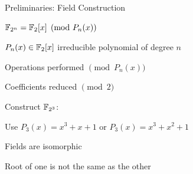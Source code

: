 \begin{frame}{\large Preliminaries: Field Construction}
\bi
	\item ${\mathbb{F}}_{2^n} = {\mathbb{F}}_2[x]\pmod{P_n(x)}$ 
	\bi
		\pause
		\item $P_n(x) \in {\mathbb{F}}_2[x]$ irreducible polynomial of degree $n$
		\pause
		\item Operations performed $\pmod{P_n(x)}$ 
		\item Coefficients reduced $\pmod{2}$
	\ei
	\pause
	\vspace{0.1in}
	\vspace{0.1in}
	\item Construct ${\mathbb{F}}_{2^3}$: 
	\bi
		\item Use $P_3(x) = x^3+x+1$ or $P_3(x) = x^3+x^2+1$
		\pause
		\bi
		\item Fields are isomorphic
		\pause
		\item Root of one is not the same as the other
		\ei
	\ei
\ei
\end{frame}



